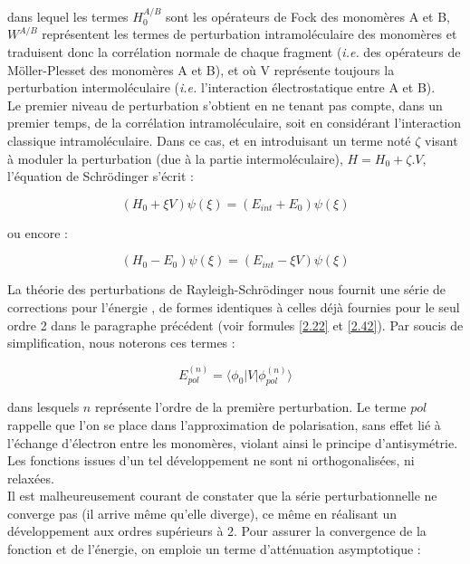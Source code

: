 	\noindent dans lequel les termes $H_{0}^{A/B}$ sont les opérateurs de Fock des monomères A et B, $W^{A/B}$ représentent les termes de perturbation intramoléculaire des monomères et traduisent donc la corrélation \og normale \fg{} de chaque fragment (\textit{i.e.} des opérateurs de Möller-Plesset des monomères A et B), et où V représente toujours la perturbation intermoléculaire (\textit{i.e.} l’interaction électrostatique entre A et B).\\
	
	Le premier niveau de perturbation s’obtient en ne tenant pas compte, dans un premier temps, de la corrélation intramoléculaire, soit en considérant l’interaction classique intramoléculaire. Dans ce cas, et en introduisant un terme noté $\zeta$ visant à moduler la perturbation (due à la partie intermoléculaire), $H = H_0 + \zeta.V$, l’équation de Schr\"{o}dinger s’écrit :
	
	\begin{equation}
	(H_{0} + \xi V) \psi (\xi) = (E_{int} + E_{0}) \psi (\xi)
	\end{equation}
	
	ou encore :
	
	\begin{equation}
	(H_{0} - E_{0}) \psi (\xi) = (E_{int} - \xi V) \psi (\xi)
	\end{equation}
	
	La théorie des perturbations de Rayleigh-Schr\"{o}dinger nous fournit une série de corrections pour l’énergie \cite{chipman1973perturbation}, de formes identiques à celles déjà fournies pour le seul ordre 2 dans le paragraphe précédent (voir formules \ref{2.22} et \ref{2.42}). Par soucis de simplification, nous noterons ces termes :
	
	\begin{equation}
	E_{pol}^{(n)} = \langle \phi_{0}|V| \phi_{pol}^{(n)} \rangle
	\end{equation}
	
	\noindent dans lesquels $n$ représente l’ordre de la première perturbation. Le terme \og $pol$ \fg{} rappelle que l'on se place dans l'approximation de polarisation, sans effet lié à l’échange d’électron entre les monomères, violant ainsi le principe d’antisymétrie. Les fonctions issues d’un tel développement ne sont ni orthogonalisées, ni relaxées.\\
	
	Il est malheureusement courant de constater que la série perturbationnelle ne converge pas (il arrive même qu'elle diverge), ce même en réalisant un développement aux ordres supérieurs à 2. Pour assurer la convergence de la fonction et de l’énergie, on emploie un terme d’atténuation asymptotique : 
	
